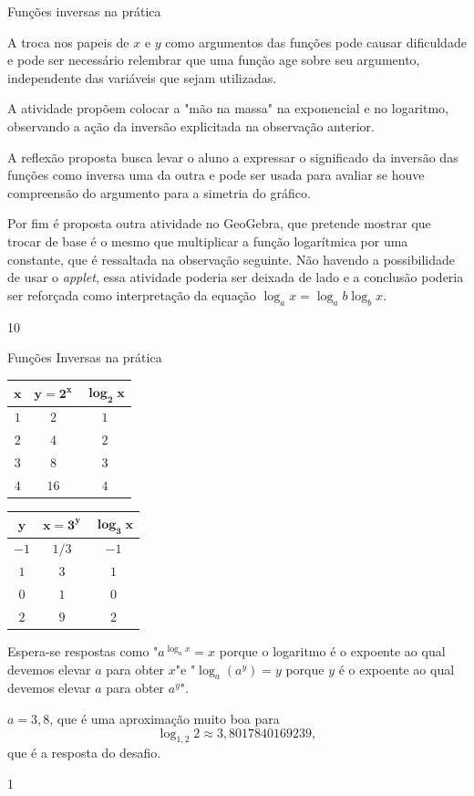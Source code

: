 \begin{sugestions}{Funções inversas na prática}
{
	A troca nos papeis de $x$ e $y$ como argumentos das funções pode causar dificuldade e pode ser necessário relembrar que uma função age sobre seu argumento, independente das variáveis que sejam utilizadas.

	A atividade propõem colocar a "mão na massa" na exponencial e no logaritmo, observando a ação da inversão explicitada na observação anterior.

	A reflexão proposta busca levar o aluno a expressar o significado da inversão das funções como inversa uma da outra e pode ser usada para avaliar se houve compreensão do argumento para a simetria do gráfico.

	Por fim é proposta outra atividade no GeoGebra, que pretende mostrar que trocar de base é o mesmo que multiplicar a função logarítmica por uma constante, que é ressaltada na observação seguinte. Não havendo a possibilidade de usar o \textit{applet}, essa atividade poderia ser deixada de lado e a conclusão poderia ser reforçada como interpretação da equação $\log_a x = \log_a b \log_b x$.
}{1}{0}
\end{sugestions}
\begin{answer}{Funções Inversas na prática}
{
	\begin{table}[H]
	\centering
	
	\begin{tabu} to \textwidth{|c|c|c|}
	\hline
	\thead
	$\bm{x}$ & $\bm{y=2^x}$ & $\bm{{\log_2 x}}$ \\
	\hline
	$1$ & $2$ & $1$ \\
	\hline
	$2$ & $4$ & $2$ \\
	\hline
	$3$ & $8$ & $3$ \\
	\hline
	$4$ & $16$ & $4$ \\
	\hline
	\end{tabu}
	\hspace{2em}
	\begin{tabu} to \textwidth{|c|c|c|}
	\hline
	\thead
	$\bm{y}$ & $\bm{x=3^y}$ & $\bm{{\log_3 x}}$ \tabularnewline
	\hline
	$-1$ & $1/3$ & $-1$ \\
	\hline
	$1$ & $3$ & $1$ \\
	\hline
	$0$ & $1$ & $0$ \\
	\hline
	$2$ & $9$ & $2$ \\
	\hline
	\end{tabu}
	\end{table}

	Espera-se respostas como "$a^{\log_a x}=x$ porque o logaritmo é o expoente ao qual devemos elevar $a$ para obter $x$"{}e "$\log_a (a^y)=y$ porque $y$ é o expoente ao qual devemos elevar $a$ para obter $a^y$".

	$a = 3{,}8$, que é uma aproximação muito boa para $$\log_{1{,}2}2 \approx 3{,}8017840169239,$$ que é a resposta do desafio.

}{1}
\end{answer}
